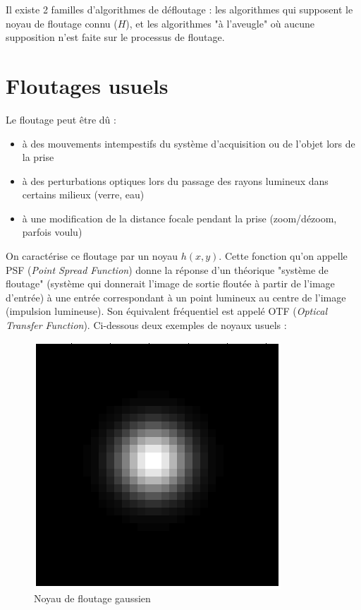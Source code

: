 \documentclass{article}
\begin{document}
	Il existe 2 familles d'algorithmes de défloutage : les algorithmes qui supposent le noyau de floutage connu ($H$), et les algorithmes "à l'aveugle" où aucune supposition n'est faite sur le processus de floutage.
	
	

\section{Floutages usuels}
\label{sec:format}

	Le floutage peut être dû : 
	\begin{itemize}
	\item à des mouvements intempestifs du système d'acquisition ou de l'objet lors de la prise
	\item à des perturbations optiques lors du passage des rayons lumineux dans certains milieux (verre, eau)
	\item à une modification de la distance focale pendant la prise (zoom/dézoom, parfois voulu)
	\end{itemize}

	On caractérise ce floutage par un noyau $h(x,y)$. Cette fonction qu'on appelle PSF (\textit{Point Spread Function}) donne la réponse d'un théorique "système de floutage" (système qui donnerait l'image de sortie floutée à partir de l'image d'entrée) à une entrée correspondant à un point lumineux au centre de l'image (impulsion lumineuse). Son équivalent fréquentiel est appelé OTF (\textit{Optical Transfer Function}). Ci-dessous deux exemples de noyaux usuels :
	
	\begin{figure}[h]
		\begin{center}			
			\includegraphics[scale=0.3]{Img/blurkernel_gauss}
		\end{center}
		\caption{Noyau de floutage gaussien}
	\end{figure}
\end{document}
